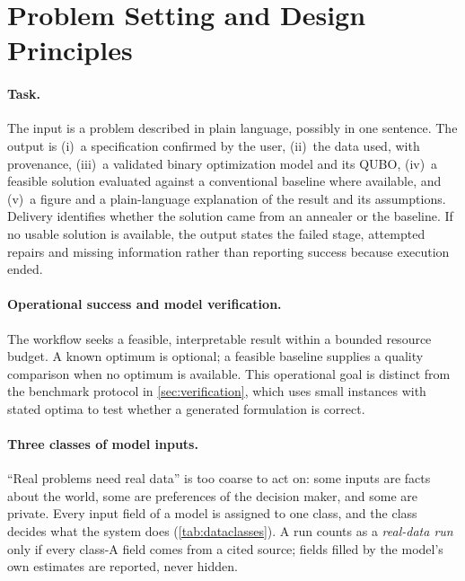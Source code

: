 \section{Problem Setting and Design Principles}
\label{sec:setting}

\paragraph{Task.}
The input is a problem described in plain language, possibly in one sentence. The output is (i)~a specification
confirmed by the user, (ii)~the data used, with provenance, (iii)~a validated binary optimization model and its
QUBO, (iv)~a feasible solution evaluated against a conventional baseline where available,
and (v)~a figure and a plain-language explanation of the result and its assumptions. Delivery identifies whether
the solution came from an annealer or the baseline. If no usable solution is available, the output states the
failed stage, attempted repairs and missing information rather than reporting success because execution ended.

\paragraph{Operational success and model verification.}
The workflow seeks a feasible, interpretable result within a bounded resource budget. A known optimum is
optional; a feasible baseline supplies a quality comparison when no optimum is available. This operational goal
is distinct from the benchmark protocol in \cref{sec:verification}, which uses small instances with stated
optima to test whether a generated formulation is correct.

\paragraph{Three classes of model inputs.}
``Real problems need real data'' is too coarse to act on: some inputs are facts about the world, some are
preferences of the decision maker, and some are private. Every input field of a model is assigned to one class,
and the class decides what the system does (\cref{tab:dataclasses}). A run counts as a \emph{real-data run} only if
every class-A field comes from a cited source; fields filled by the model's own estimates are reported, never
hidden.

